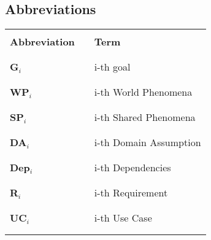 \subsection{Abbreviations}
\begin{table}[H]
    \centering
    \renewcommand{\arraystretch}{0.5}
    \begin{tabular}{l l p{10.5cm}}
        \hline
                              &        &                        \\
        \textbf{Abbreviation} & \vline & \textbf{Term}          \\
                              &        &                        \\\hline & & \\
        \textbf{G}\(_i\)      & \vline & i-th goal              \\
                              &        &                        \\\hline & & \\
        \textbf{WP}\(_i\)     & \vline & i-th World Phenomena   \\
                              &        &                        \\\hline & & \\
        \textbf{SP}\(_i\)     & \vline & i-th Shared Phenomena  \\
                              &        &                        \\\hline & & \\
        \textbf{DA}\(_i\)     & \vline & i-th Domain Assumption \\
                              &        &                        \\\hline & & \\
        \textbf{Dep}\(_i\)    & \vline & i-th Dependencies      \\
                              &        &                        \\\hline & & \\
        \textbf{R}\(_i\)      & \vline & i-th Requirement       \\
                              &        &                        \\\hline & & \\
        \textbf{UC}\(_i\)     & \vline & i-th Use Case          \\
                              &        &                        \\\hline & & \\

\end{tabular}
\end{table}
